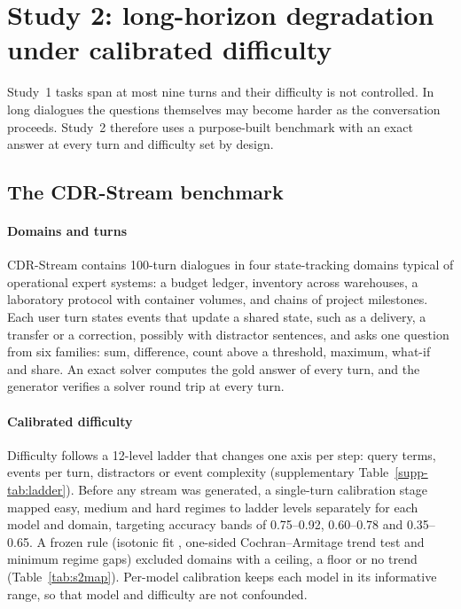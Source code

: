 \section{Study 2: long-horizon degradation under calibrated difficulty}
\label{sec:study2}

Study~1 tasks span at most nine turns and their difficulty is not controlled.
In long dialogues the questions themselves may become harder as the
conversation proceeds. Study~2 therefore uses a purpose-built benchmark with an
exact answer at every turn and difficulty set by design.

\subsection{The CDR-Stream benchmark}

\paragraph{Domains and turns}
CDR-Stream contains 100-turn dialogues in four state-tracking domains typical
of operational expert systems: a budget ledger, inventory across warehouses, a
laboratory protocol with container volumes, and chains of project milestones.
Each user turn states events that update a shared state, such as a delivery, a
transfer or a correction, possibly with distractor sentences, and asks one
question from six families: sum, difference, count above a threshold, maximum,
what-if and share. An exact solver computes the gold answer of every turn, and
the generator verifies a solver round trip at every turn.

\paragraph{Calibrated difficulty}
Difficulty follows a 12-level ladder that changes one axis per step: query
terms, events per turn, distractors or event complexity (supplementary
Table~\ref{supp-tab:ladder}). Before any stream was generated, a single-turn
calibration stage mapped easy, medium and hard regimes to ladder levels
separately for each model and domain, targeting accuracy bands of 0.75--0.92,
0.60--0.78 and 0.35--0.65. A frozen rule (isotonic fit
\citep{barlow1972statistical}, one-sided Cochran--Armitage trend test
\citep{armitage1955tests} and minimum regime gaps) excluded domains with a
ceiling, a floor or no trend (Table~\ref{tab:s2map}). Per-model calibration
keeps each model in its informative range, so that model and difficulty are
not confounded.

